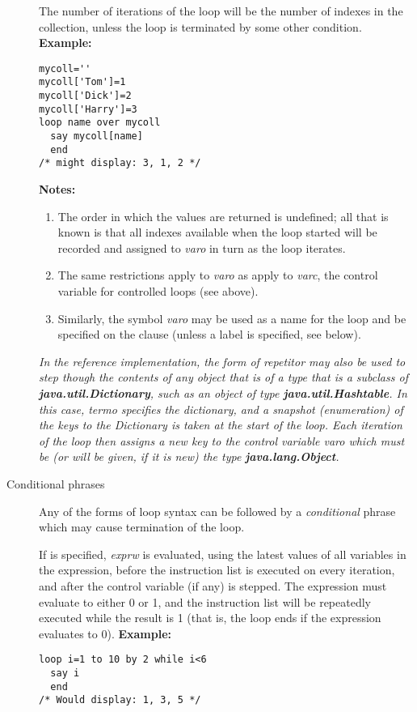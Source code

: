\begin{description}
The number of iterations of the loop will be the number of indexes in
the collection, unless the loop is terminated by some other condition.
 \textbf{Example:}
\begin{lstlisting}
mycoll=''
mycoll['Tom']=1
mycoll['Dick']=2
mycoll['Harry']=3
loop name over mycoll
  say mycoll[name]
  end
/* might display: 3, 1, 2 */
\end{lstlisting}
 \textbf{Notes:}
\begin{enumerate}
\item 
The order in which the values are returned is undefined; all that
is known is that all indexes available when the loop started will be
recorded and assigned to \emph{varo} in turn as the loop iterates.
\item 
The same restrictions apply to \emph{varo} as apply to
\emph{varc}, the control variable for controlled loops (see above).
\item 
Similarly, the symbol \emph{varo} may be used as a name for the loop
and be specified on the  clause (unless a label is
specified, see below).
\end{enumerate}
 \emph{In the reference implementation, the  form of
repetitor may also be used to step though the contents of any object
that is of a type that is a subclass of \textbf{java.util.Dictionary},
such as an object of type \textbf{java.util.Hashtable}.
In this case, \emph{termo} specifies the dictionary, and a snapshot
(enumeration) of the keys to the Dictionary is taken at the start of the
loop.
Each iteration of the loop then assigns a new key to the control
variable \emph{varo} which must be (or will be given, if it is new)
the type \textbf{java.lang.Object}.
}
\item[Conditional phrases]\label{refloopwu}

Any of the forms of loop syntax can be followed by a
\emph{conditional} phrase which may cause termination of the loop.
 
If  is specified, \emph{exprw} is evaluated, using the
latest values of all variables in the expression, before the instruction
list is executed on every iteration, and after the control
variable (if any) is stepped.
The expression must evaluate to either 0 or 1, and the instruction list
will be repeatedly executed while the result is 1 (that is, the loop
ends if the expression evaluates to 0).
 \textbf{Example:}
\begin{lstlisting}
loop i=1 to 10 by 2 while i<6
  say i
  end
/* Would display: 1, 3, 5 */
\end{lstlisting}
 

\end{description}
